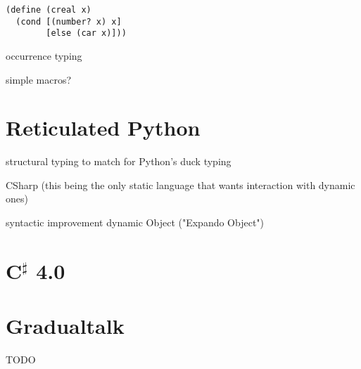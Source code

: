 \begin{verbatim}
(define (creal x)
  (cond [(number? x) x]
        [else (car x)]))
\end{verbatim}

occurrence typing

simple macros?

\section{Reticulated Python}


structural typing to match for Python's duck typing

CSharp (this being the only static language that wants interaction with dynamic ones)

syntactic improvement
dynamic Object ("Expando Object")

\section{C$^\sharp$ 4.0}


\section{Gradualtalk}

TODO